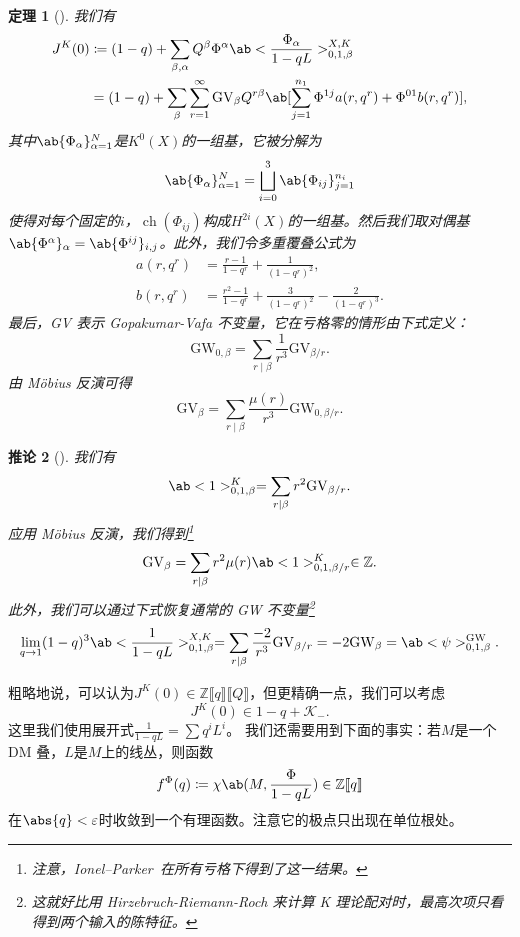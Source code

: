 \documentclass{amsart}
\newtheorem{thm}{定理}[section]
\newtheorem{cor}[thm]{推论}
\theoremstyle{definition}
\theoremstyle{remark}
\theoremstyle{plain}
\theoremstyle{definition}
\theoremstyle{remark}
\newcommand{\Z}{\mathbb{Z}}
\newcommand{\ep}{\varepsilon}
\newcommand{\mc}[1]{\mathcal{#1}}
\newcommand{\mr}[1]{\mathrm{#1}}
\newcommand{\1}{\mathbf{1}}
\newcommand{\2}{\mathbf{2}}
\newcommand{\3}{\mathbf{3}}
\newcommand{\ps}[1]{\llbracket #1 \rrbracket}
\DeclareMathOperator{\ch}{ch}
\begin{document}
\begin{thm}[{\cite{ChouLee2025}}]
    我们有
    \begin{align*}
        J^K(0) &\coloneqq (1-q) + \sum_{\beta, \alpha} Q^{\beta} \Phi^{\alpha} \ab<\frac{\Phi_{\alpha}}{1-qL}>_{0,1,\beta}^{X,K} \\
        &= (1-q) + \sum_{\beta} \sum_{r=1}^{\infty} \mr{GV}_{\beta} Q^{r\beta} \ab[\sum_{j=1}^{n_1} \Phi^{1j} a(r, q^r) + \Phi^{01} b(r, q^r)],
    \end{align*}
    其中\(\ab\{\Phi_{\alpha}\}_{\alpha=1}^N\)是\(K^0(X)\)的一组基，它被分解为
    \[ \ab\{\Phi_{\alpha}\}_{\alpha=1}^N = \bigsqcup_{i=0}^3 \ab\{\Phi_{ij}\}_{j=1}^{n_i} \]
    使得对每个固定的\(i\)，\(\ch(\Phi_{ij})\)构成\(H^{2i}(X)\)的一组基。然后我们取对偶基\(\ab\{\Phi^{\alpha}\}_{\alpha} = \ab\{\Phi^{ij}\}_{i,j}\)。此外，我们令多重覆叠公式为
    \begin{align*}
        a(r, q^r) &= \frac{r-1}{1-q^r} + \frac{1}{(1-q^r)^2}, \\
        b(r, q^r) &= \frac{r^2-1}{1-q^r} + \frac{3}{(1-q^r)^2} - \frac{2}{(1-q^r)^3}.
    \end{align*}
    最后，GV 表示 Gopakumar-Vafa 不变量，它在亏格零的情形由下式定义：
    \[ \mr{GW}_{0,\beta} = \sum_{r \mid \beta} \frac{1}{r^3} \mr{GV}_{\beta/r}. \]
    由 M\"obius 反演可得
    \[ \mr{GV}_{\beta} = \sum_{r \mid \beta} \frac{\mu(r)}{r^3} \mr{GW}_{0,\beta/r}. \]
\end{thm}

\begin{cor}[{\cite{ChouLee2025}}]
    我们有
    \[ \ab<1>_{0,1,\beta}^K = \sum_{r \mid \beta} r^2 \mr{GV}_{\beta/r}. \]
    应用 M\"obius 反演，我们得到\footnote{注意，Ionel--Parker~\cite{IonelParker2018}在所有亏格下得到了这一结果。}
    \[ \mr{GV}_{\beta} = \sum_{r \mid \beta} r^2 \mu(r) \ab<1>_{0,1,\beta/r}^K \in \Z. \]
    此外，我们可以通过下式恢复通常的 GW 不变量\footnote{这就好比用 Hirzebruch-Riemann-Roch 来计算 K 理论配对时，最高次项只看得到两个输入的陈特征。}
    \[ \lim_{q \to 1} (1-q)^3 \ab<\frac{1}{1-qL}>_{0,1,\beta}^{X,K} = \sum_{r \mid \beta} \frac{-2}{r^3} \mr{GV}_{\beta/r} = -2 \mr{GW}_{\beta} = \ab<\psi>_{0,1,\beta}^{\mr{GW}}. \]
\end{cor}

粗略地说，可以认为\(J^K(0) \in \Z\ps{q}\ps{Q}\)，但更精确一点，我们可以考虑
\[ J^K(0) \in 1-q + \mc{K}_-. \]
这里我们使用展开式\(\frac{1}{1-qL} = \sum q^i L^i\)。
我们还需要用到下面的事实：若\(M\)是一个 DM 叠，\(L\)是\(M\)上的线丛，则函数
\[ f^{\Phi}(q) \coloneqq \chi\ab(M, \frac{\Phi}{1-qL}) \in \Z \ps{q} \]
在\(\abs{q} < \ep\)时收敛到一个有理函数。注意它的极点只出现在单位根处。
\end{document}
